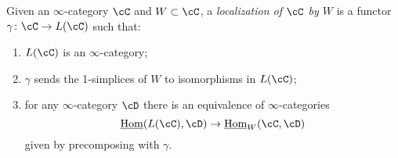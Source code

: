 \documentclass[a4paper,12pt]{scrartcl}
\begin{document}
\begin{defn}
  Given an $\infty$-category $\cC$ and $W\subset\cC$, a \emph{localization of
  $\cC$ by $W$} is a functor $\gamma\colon\cC\rightarrow L(\cC)$ such that:
  \begin{enumerate}
    \item $L(\cC)$ is an $\infty$-category;
    \item $\gamma$ sends the 1-simplices of $W$ to isomorphisms in $L(\cC)$;
    \item for any $\infty$-category $\cD$ there is an equivalence of
      $\infty$-categories
      \[\Home(L(\cC),\cD)\rightarrow\Home_W(\cC,\cD)\]
      given by precomposing with $\gamma$.
  \end{enumerate}
\end{defn}

\end{document}
